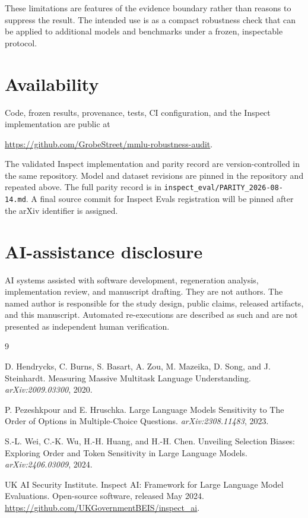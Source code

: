 \documentclass[10pt]{article}
\begin{document}
These limitations are features of the evidence boundary rather than reasons to suppress the result. The intended use is as a compact robustness check that can be applied to additional models and benchmarks under a frozen, inspectable protocol.

\section{Availability}

Code, frozen results, provenance, tests, CI configuration, and the Inspect implementation are public at
\begin{center}
\url{https://github.com/GrobeStreet/mmlu-robustness-audit}.
\end{center}
The validated Inspect implementation and parity record are version-controlled in the same repository. Model and dataset revisions are pinned in the repository and repeated above. The full parity record is in \texttt{inspect\_eval/PARITY\_2026-08-14.md}. A final source commit for Inspect Evals registration will be pinned after the arXiv identifier is assigned.

\section*{AI-assistance disclosure}

AI systems assisted with software development, regeneration analysis, implementation review, and manuscript drafting. They are not authors. The named author is responsible for the study design, public claims, released artifacts, and this manuscript. Automated re-executions are described as such and are not presented as independent human verification.

\begin{thebibliography}{9}

D. Hendrycks, C. Burns, S. Basart, A. Zou, M. Mazeika, D. Song, and J. Steinhardt.
\newblock Measuring Massive Multitask Language Understanding.
\newblock \emph{arXiv:2009.03300}, 2020.

P. Pezeshkpour and E. Hruschka.
\newblock Large Language Models Sensitivity to The Order of Options in Multiple-Choice Questions.
\newblock \emph{arXiv:2308.11483}, 2023.

S.-L. Wei, C.-K. Wu, H.-H. Huang, and H.-H. Chen.
\newblock Unveiling Selection Biases: Exploring Order and Token Sensitivity in Large Language Models.
\newblock \emph{arXiv:2406.03009}, 2024.

UK AI Security Institute.
\newblock Inspect AI: Framework for Large Language Model Evaluations.
\newblock Open-source software, released May 2024. \url{https://github.com/UKGovernmentBEIS/inspect_ai}.

\end{thebibliography}
\end{document}
